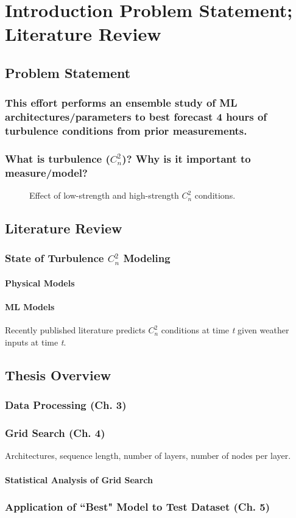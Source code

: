 \chapter{Introduction Problem Statement; Literature Review}
\label{ch1}

\section{Problem Statement}
\subsection{This effort performs an ensemble study of ML architectures/parameters to best forecast 4 hours of turbulence conditions from prior measurements.}

\subsection{What is turbulence ($C_{n}^{2}$)? Why is it important to measure/model?}
\begin{figure}[h!]
	\centering
	\hfill
	\caption{Effect of low-strength and high-strength $C_{n}^{2}$ conditions.}
	\label{fig:first_frames}
\end{figure}

\section{Literature Review}
\subsection{State of Turbulence $C_{n}^{2}$ Modeling}
\subsubsection{Physical Models}
\subsubsection{ML Models}
Recently published literature predicts $C_{n}^{2}$ conditions at time \textit{t} given weather inputs at time \textit{t}.


\section{Thesis Overview}
\subsection{Data Processing (Ch. 3)}
\subsection{Grid Search (Ch. 4)}
Architectures, sequence length, number of layers, number of nodes per layer.
\subsubsection{Statistical Analysis of Grid Search}
\subsection{Application of ``Best" Model to Test Dataset (Ch. 5)}